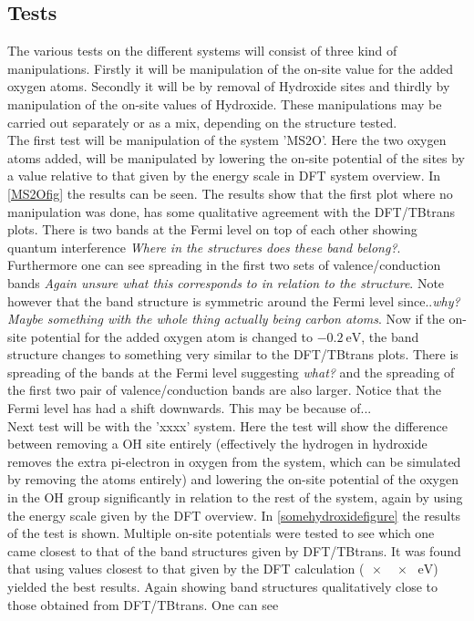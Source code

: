 \subsection{Tests}
The various tests on the different systems will consist of three kind of manipulations. Firstly it will be manipulation of the on-site value for the added oxygen atoms. Secondly it will be by removal of Hydroxide sites and thirdly by manipulation of the on-site values of Hydroxide. These manipulations may be carried out separately or as a mix, depending on the structure tested. \\
The first test will be manipulation of the system 'MS2O'. Here the two oxygen atoms added, will be manipulated by lowering the on-site potential of the sites by a value relative to that given by the energy scale in DFT system overview. In \cref{MS2Ofig} the results can be seen. 
The results show that the first plot where no manipulation was done, has some qualitative agreement with the DFT/TBtrans plots. There is two bands at the Fermi level on top of each other showing quantum interference \textit{Where in the structures does these band belong?}. Furthermore  one can see spreading in the first two sets of valence/conduction bands \textit{Again unsure what this corresponds to in relation to the structure}. Note however that the band structure is symmetric around the Fermi level since..\textit{why? Maybe something with the whole thing actually being carbon atoms}. Now if the on-site potential for the added oxygen atom is changed to \(\SI{-0.2}{\electronvolt}\), the band structure changes to something very similar to the DFT/TBtrans plots. There is spreading of the bands at the Fermi level suggesting \textit{what?} and the spreading of the first two pair of valence/conduction bands are also larger. Notice that the Fermi level has had a shift downwards. This may be because of... \\
Next test will be with the 'xxxx' system. Here the test will show the difference between removing a OH site entirely (effectively the hydrogen in hydroxide removes the extra pi-electron in oxygen from the system, which can be simulated by removing the atoms entirely) and lowering the on-site potential of the oxygen in the OH group significantly in relation to the rest of the system, again by using the energy scale given by the DFT overview. In \cref{somehydroxidefigure} the results of the test is shown. Multiple on-site potentials were tested to see which one came closest to that of the band structures given by DFT/TBtrans. It was found that using values closest to that given by the DFT calculation (\(\SI{xx}{\electronvolt}\)) yielded the best results. Again showing band structures qualitatively close to those obtained from DFT/TBtrans. One can see 
